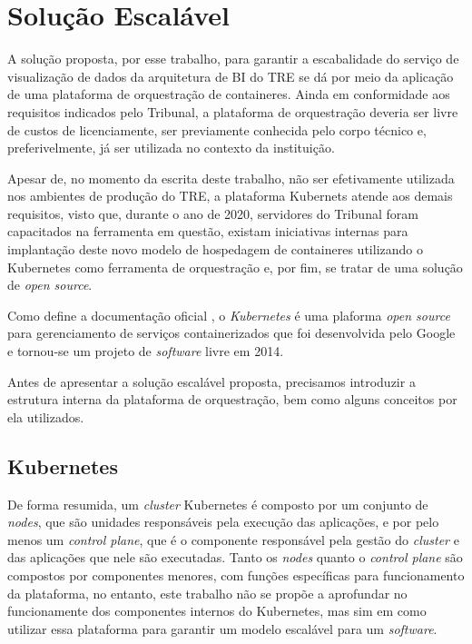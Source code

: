\section{Solução Escalável}

A solução proposta, por esse trabalho, para garantir a escabalidade do serviço de visualização de dados da arquitetura de BI do TRE se dá por meio da aplicação de uma plataforma de orquestração de containeres. Ainda em conformidade aos requisitos indicados pelo Tribunal, a plataforma de orquestração deveria ser livre de custos de licenciamente, ser previamente conhecida pelo corpo técnico e, preferivelmente, já ser utilizada no contexto da instituição.

Apesar de,  no momento da escrita deste trabalho, não ser efetivamente utilizada nos ambientes de produção do TRE, a plataforma Kubernets atende aos demais requisitos, visto que, durante o ano de 2020, servidores do Tribunal foram capacitados na ferramenta em questão, existam iniciativas internas para implantação deste novo modelo de hospedagem de containeres utilizando o Kubernetes como ferramenta de orquestração e, por fim, se tratar de uma solução de \textit{open source}.

Como define a documentação oficial \cite{k8sDoc}, o \textit{Kubernetes} é uma plaforma \textit{open source} para gerenciamento de serviços containerizados que foi desenvolvida pelo Google e tornou-se um projeto de \textit{software} livre em 2014.

Antes de apresentar a solução escalável proposta, precisamos introduzir a estrutura interna da plataforma de orquestração, bem como alguns conceitos por ela utilizados.

\subsection{Kubernetes}

De forma resumida, um \textit{cluster} Kubernetes é composto por um conjunto de \textit{nodes}, que são unidades responsáveis pela execução das aplicações, e por pelo menos um \textit{control plane}, que é o componente responsável pela gestão do \textit{cluster} e das aplicações que nele são executadas. Tanto os \textit{nodes} quanto o \textit{control plane} são compostos por componentes menores, com funções específicas para funcionamento da plataforma, no entanto, este trabalho não se propõe a aprofundar no funcionamente dos componentes internos do Kubernetes, mas sim em como utilizar essa plataforma para garantir um modelo escalável para um \textit{software}.

